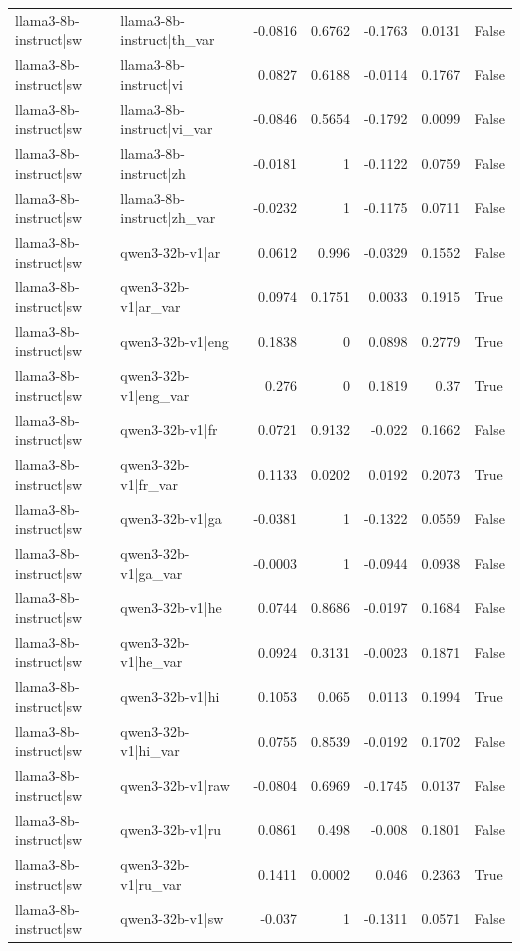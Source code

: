 \begin{table}
\begin{tabular}{l l r r r r l}
llama3-8b-instruct|sw & llama3-8b-instruct|th_var & -0.0816 & 0.6762 & -0.1763 & 0.0131 & False \\
llama3-8b-instruct|sw & llama3-8b-instruct|vi & 0.0827 & 0.6188 & -0.0114 & 0.1767 & False \\
llama3-8b-instruct|sw & llama3-8b-instruct|vi_var & -0.0846 & 0.5654 & -0.1792 & 0.0099 & False \\
llama3-8b-instruct|sw & llama3-8b-instruct|zh & -0.0181 & 1 & -0.1122 & 0.0759 & False \\
llama3-8b-instruct|sw & llama3-8b-instruct|zh_var & -0.0232 & 1 & -0.1175 & 0.0711 & False \\
llama3-8b-instruct|sw & qwen3-32b-v1|ar & 0.0612 & 0.996 & -0.0329 & 0.1552 & False \\
llama3-8b-instruct|sw & qwen3-32b-v1|ar_var & 0.0974 & 0.1751 & 0.0033 & 0.1915 & True \\
llama3-8b-instruct|sw & qwen3-32b-v1|eng & 0.1838 & 0 & 0.0898 & 0.2779 & True \\
llama3-8b-instruct|sw & qwen3-32b-v1|eng_var & 0.276 & 0 & 0.1819 & 0.37 & True \\
llama3-8b-instruct|sw & qwen3-32b-v1|fr & 0.0721 & 0.9132 & -0.022 & 0.1662 & False \\
llama3-8b-instruct|sw & qwen3-32b-v1|fr_var & 0.1133 & 0.0202 & 0.0192 & 0.2073 & True \\
llama3-8b-instruct|sw & qwen3-32b-v1|ga & -0.0381 & 1 & -0.1322 & 0.0559 & False \\
llama3-8b-instruct|sw & qwen3-32b-v1|ga_var & -0.0003 & 1 & -0.0944 & 0.0938 & False \\
llama3-8b-instruct|sw & qwen3-32b-v1|he & 0.0744 & 0.8686 & -0.0197 & 0.1684 & False \\
llama3-8b-instruct|sw & qwen3-32b-v1|he_var & 0.0924 & 0.3131 & -0.0023 & 0.1871 & False \\
llama3-8b-instruct|sw & qwen3-32b-v1|hi & 0.1053 & 0.065 & 0.0113 & 0.1994 & True \\
llama3-8b-instruct|sw & qwen3-32b-v1|hi_var & 0.0755 & 0.8539 & -0.0192 & 0.1702 & False \\
llama3-8b-instruct|sw & qwen3-32b-v1|raw & -0.0804 & 0.6969 & -0.1745 & 0.0137 & False \\
llama3-8b-instruct|sw & qwen3-32b-v1|ru & 0.0861 & 0.498 & -0.008 & 0.1801 & False \\
llama3-8b-instruct|sw & qwen3-32b-v1|ru_var & 0.1411 & 0.0002 & 0.046 & 0.2363 & True \\
llama3-8b-instruct|sw & qwen3-32b-v1|sw & -0.037 & 1 & -0.1311 & 0.0571 & False \\

\end{tabular}
\end{table}
